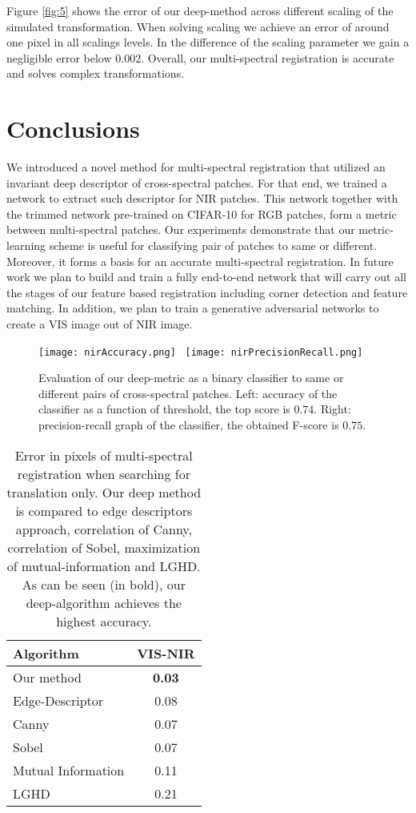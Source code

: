 \documentclass[10pt,twocolumn,letterpaper]{article}
\begin{document}
Figure \ref{fig:5} shows the error of our deep-method across different scaling of the simulated transformation. When solving scaling we achieve an error of around one pixel in all scalings levels. In the difference of the scaling parameter we gain a negligible error below 0.002. Overall, our multi-spectral registration is accurate and solves complex transformations. 

\section{Conclusions} \label{sec:conclusions}

We introduced a novel method for multi-spectral registration that utilized an invariant deep descriptor of cross-spectral patches. For that end, we trained a network to extract such descriptor for NIR patches. This network together with the trimmed network pre-trained on CIFAR-10 for RGB patches, form a metric between multi-spectral patches. Our experiments demonstrate that our metric-learning scheme is useful for classifying pair of patches to same or different. Moreover, it forms a basis for an accurate multi-spectral registration. In future work we plan to build and train a fully end-to-end network that will carry out all the stages of our feature based registration including corner detection and feature matching. In addition, we plan to train a generative adversarial networks to create a VIS image out of NIR image. 

\begin{figure}
	\centering
	\texttt{[image: nirAccuracy.png]}~
	\texttt{[image: nirPrecisionRecall.png]}	
	\caption{Evaluation of our deep-metric as a binary classifier to same or different pairs of cross-spectral patches. Left: accuracy of the classifier as a function of threshold, the top score is $0.74$. Right: precision-recall graph of the classifier, the obtained F-score is $0.75$.}
	\label{fig:3}       %
\end{figure}


\begin{table}
	\centering
	\begin{tabular}{ l | c }
		Algorithm & VIS-NIR \\
		\hline
		Our method & \textbf{0.03} \\
		Edge-Descriptor & 0.08 \\
		Canny & 0.07 \\
		Sobel & 0.07 \\
		Mutual Information & 0.11 \\
		LGHD & 0.21
	\end{tabular}
	\caption{Error in pixels of multi-spectral registration when searching for translation only. Our deep method is compared to edge descriptors approach, correlation of Canny, correlation of Sobel, maximization of mutual-information and LGHD. As can be seen (in bold), our deep-algorithm achieves the highest accuracy.}
	\label{table:2}
\end{table}
\end{document}
